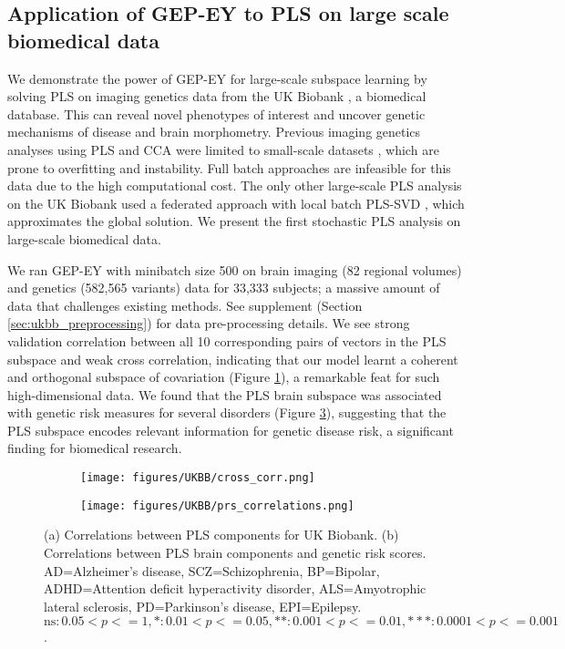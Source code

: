\subsection{Application of GEP-EY to PLS on large scale biomedical data}

We demonstrate the power of GEP-EY for large-scale subspace learning by solving PLS on imaging genetics data from the UK Biobank \cite{sudlow2015uk}, a biomedical database. This can reveal novel phenotypes of interest and uncover genetic mechanisms of disease and brain morphometry. Previous imaging genetics analyses using PLS and CCA were limited to small-scale datasets \cite{Lorenzi2018,Taquet2021,Lefloch2012}, which are prone to overfitting and instability. Full batch approaches are infeasible for this data due to the high computational cost. The only other large-scale PLS analysis on the UK Biobank used a federated approach with local batch PLS-SVD \cite{lorenzi2016}, which approximates the global solution. We present the first stochastic PLS analysis on large-scale biomedical data.

We ran GEP-EY with minibatch size 500 on brain imaging (82 regional volumes) and genetics (582,565 variants) data for 33,333 subjects; a massive amount of data that challenges existing methods. See supplement (Section \ref{sec:ukbb_preprocessing}) for data pre-processing details. We see strong validation correlation between all 10 corresponding pairs of vectors in the PLS subspace and weak cross correlation, indicating that our model learnt a coherent and orthogonal subspace of covariation (Figure \ref{fig:UKBB_corr}), a remarkable feat for such high-dimensional data. We found that the PLS brain subspace was associated with genetic risk measures for several disorders (Figure \ref{fig:genetic_risk}), suggesting that the PLS subspace encodes relevant information for genetic disease risk, a significant finding for biomedical research.


\begin{figure}
\centering
     \begin{subfigure}[b]{0.27\textwidth}
         \centering
          \texttt{[image: figures/UKBB/cross\_corr.png]}
          \caption{}
          \label{fig:UKBB_corr}
     \end{subfigure}
     \begin{subfigure}[b]{0.72\textwidth}
         \centering
          \texttt{[image: figures/UKBB/prs\_correlations.png]}
          \caption{}
          \label{fig:genetic_risk}
     \end{subfigure}
\caption{(a) Correlations between PLS components for UK Biobank. (b) Correlations between PLS brain components and genetic risk scores. AD=Alzheimer's disease, SCZ=Schizophrenia, BP=Bipolar, ADHD=Attention deficit hyperactivity disorder, ALS=Amyotrophic lateral sclerosis, PD=Parkinson's disease, EPI=Epilepsy. $\text{ns}: 0.05< p <= 1, \ast: 0.01< p <=0.05, \ast\ast: 0.001< p <= 0.01, \ast\ast\ast: 0.0001< p <= 0.001$.}
\end{figure}

